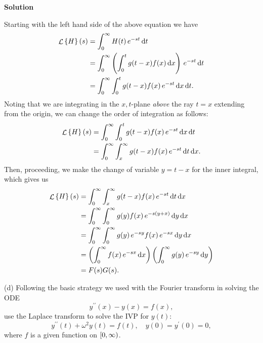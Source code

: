 \documentclass{article}
\DeclareMathOperator{\Lagr}{\mathcal{L}}
\begin{document}
\textbf{Solution}

Starting with the left hand side of the above equation we have
%
\begin{align*}
    \Lagr \cbr{H}(s)
        &= \int_0^\infty H(t) \, e^{-s t} \dif t \\
        &= \int_0^\infty
            \del{\int_0^t g(t - x) f(x) \dif x}
            \, e^{-s t} \dif t
            \\
        &= \int_0^\infty \int_0^t
            g(t - x) f(x) \, e^{-s t}
            \dif x \dif t
            .
\end{align*}
%
Noting that we are integrating in the $x, t$-plane \textit{above} the
ray $t = x$ extending from the origin, we can change the order of
integration as follows:
%
\begin{align*}
    \Lagr \cbr{H}(s)
        &= \int_0^\infty \int_0^t
            g(t - x) f(x) \, e^{-s t}
            \dif x \dif t
            \\
        &= \int_0^\infty \int_x^\infty
            g(t - x) f(x) \, e^{-s t}
            \dif t \dif x
            .
\end{align*}
%
Then, proceeding, we make the change of variable $y = t - x$ for the
inner integral, which gives us
%
\begin{align*}
    \Lagr \cbr{H}(s)
        &= \int_0^\infty \int_x^\infty
            g(t - x) f(x) \, e^{-s t}
            \dif t \dif x
            \\
        &= \int_0^\infty \int_0^\infty
            g(y) f(x) \, e^{-s (y + x)}
            \dif y \dif x
            \\
        &= \int_0^\infty \int_0^\infty
            g(y) \, e^{-s y} f(x) \, e^{-s x}
            \dif y \dif x
            \\
        &= \del{
            \int_0^\infty
            f(x) \, e^{-s x}
            \dif x
           }
           \del{
            \int_0^\infty
            g(y) \, e^{-s y}
            \dif y
           }
            \\
        &= F(s) G(s)
            .
\end{align*}

\vspace{5mm}

(d) Following the basic strategy we used with the Fourier transform in
solving the ODE
%
\begin{equation*}
    y^{\prime \prime}(x) - y(x) = f(x)
    ,
\end{equation*}
%
use the Laplace transform to solve the IVP for $y(t)$:
%
\begin{equation*}
    y^{\prime \prime}(t) + \omega^2 y(t) = f(t)
    ,\quad
    y(0) = y^\prime(0) = 0
    ,
\end{equation*}
%
where $f$ is a given function on $\intco{0, \infty}$.
\end{document}
